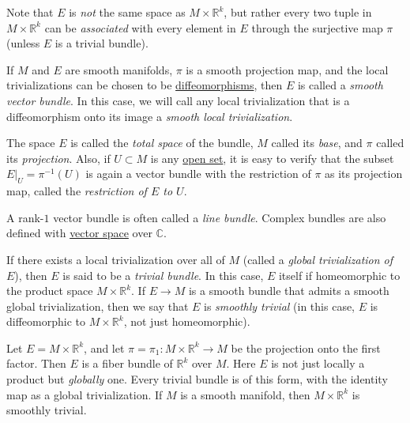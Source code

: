 \documentclass{article}
\newcounter{definition}[section]
\newcounter{example}[section]
\begin{document}
  Note that $E$ is \textit{not} the same space as $M \times \mathbb{R}^k$, but rather every two tuple in $M \times \mathbb{R}^k$ can be \textit{associated} with every element in $E$ through the surjective map $\pi$ (unless $E$ is a trivial bundle). 

  \begin{definition}
    \label{def:smooth-vector-bundle}
  If $M$ and $E$ are smooth manifolds, $\pi$ is a smooth projection map, and the local trivializations can be chosen to be \hyperref[def:diffeomorphism-2]{diffeomorphisms}, then $E$ is called a \textit{smooth vector bundle}. In this case, we will call any local trivialization that is a diffeomorphism onto its image a \textit{smooth local trivialization}. 

  The space $E$ is called the \textit{total space} of the bundle, $M$ called its \textit{base}, and $\pi$ called its \textit{projection}. Also, if $U \subset M$ is any \hyperref[pst-def:open-set]{open set}, it is easy to verify that the subset $E |_U = \pi^{-1} (U)$ is again a vector bundle with the restriction of $\pi$ as its projection map, called the \textit{restriction of $E$ to $U$}. 
  \end{definition}

  A rank-$1$ vector bundle is often called a \textit{line bundle}. Complex bundles are also defined with \hyperref[lin-def:vector-space]{vector space} over $\mathbb{C}$. 

  \begin{definition}
    \label{def:global-trivialization-and-trivial-bundles}
  If there exists a local trivialization over all of $M$ (called a \textit{global trivialization of $E$}), then $E$ is said to be a \textit{trivial bundle}. In this case, $E$ itself if homeomorphic to the product space $M \times \mathbb{R}^k$. If $E \to M$ is a smooth bundle that admits a smooth global trivialization, then we say that $E$ is \textit{smoothly trivial} (in this case, $E$ is diffeomorphic to $M \times \mathbb{R}^k$, not just homeomorphic). 
  \end{definition}

  \begin{example}
    \label{ex:trivial-bundle}
  Let $E = M \times \mathbb{R}^k$, and let $\pi = \pi_1: M \times \mathbb{R}^k \to M$ be the projection onto the first factor. Then $E$ is a fiber bundle of $\mathbb{R}^k$ over $M$. Here $E$ is not just locally a product but \textit{globally} one. Every trivial bundle is of this form, with the identity map as a global trivialization. If $M$ is a smooth manifold, then $M \times \mathbb{R}^k$ is smoothly trivial. 
  \end{example}
\end{document}

